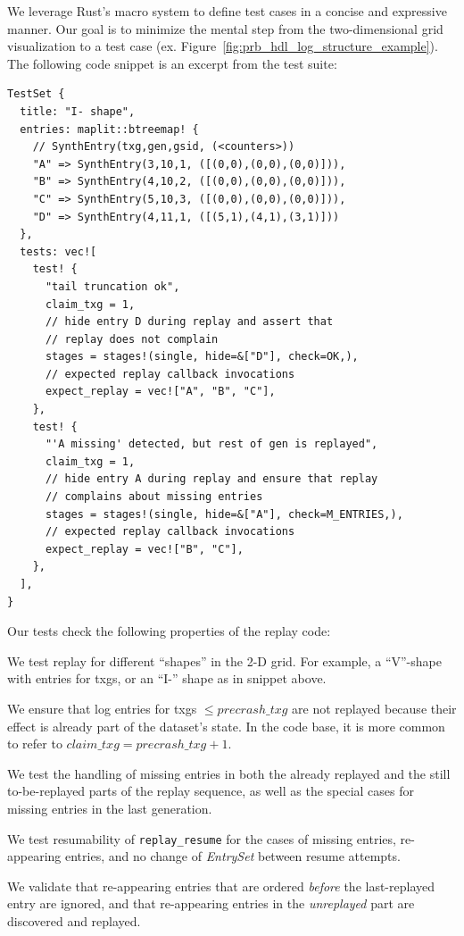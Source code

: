 \documentclass[12pt,a4paper,twoside]{book}
\begin{document}
We leverage Rust's macro system to define test cases in a concise and expressive manner.
Our goal is to minimize the mental step from the two-dimensional grid visualization to a test case (ex. Figure~\ref{fig:prb_hdl_log_structure_example}).
The following code snippet is an excerpt from the test suite:

\begin{lstlisting}[style=figurepseudocode]
TestSet {
  title: "I- shape",
  entries: maplit::btreemap! {
    // SynthEntry(txg,gen,gsid, (<counters>))
    "A" => SynthEntry(3,10,1, ([(0,0),(0,0),(0,0)])),
    "B" => SynthEntry(4,10,2, ([(0,0),(0,0),(0,0)])),
    "C" => SynthEntry(5,10,3, ([(0,0),(0,0),(0,0)])),
    "D" => SynthEntry(4,11,1, ([(5,1),(4,1),(3,1)]))
  },
  tests: vec![
    test! {
      "tail truncation ok",
      claim_txg = 1,
      // hide entry D during replay and assert that
      // replay does not complain
      stages = stages!(single, hide=&["D"], check=OK,),
      // expected replay callback invocations
      expect_replay = vec!["A", "B", "C"],
    },
    test! {
      "'A missing' detected, but rest of gen is replayed",
      claim_txg = 1,
      // hide entry A during replay and ensure that replay
      // complains about missing entries
      stages = stages!(single, hide=&["A"], check=M_ENTRIES,),
      // expected replay callback invocations
      expect_replay = vec!["B", "C"],
    },
  ],
}
\end{lstlisting}

Our tests check the following properties of the replay code:
\begin{description}[noitemsep,leftmargin=1.5cm,labelindent=1cm]
    \item[Shapes] We test replay for different ``shapes'' in the 2-D grid.
        For example, a ``V''-shape with entries for txgs, or an ``I-'' shape as in snippet above.
    \item[Claim Txg] We ensure that log entries for txgs $\le precrash\_txg$ are not replayed because their effect is already part of the dataset's state.
        In the code base, it is more common to refer to $claim\_txg = precrash\_txg + 1$.
    \item[Missing Entry Handling] We test the handling of missing entries in both the already replayed and the still to-be-replayed parts of the replay sequence, as well as the special cases for missing entries in the last generation.
    \item[Resumability] We test resumability of \lstinline{replay_resume} for the cases of missing entries, re-appearing entries, and no change of \textit{EntrySet} between resume attempts.
    \item[Entry Reappearance] We validate that re-appearing entries that are ordered \textit{before} the last-replayed entry are ignored, and that re-appearing entries in the \textit{unreplayed} part are discovered and replayed.
\end{description}
\end{document}
